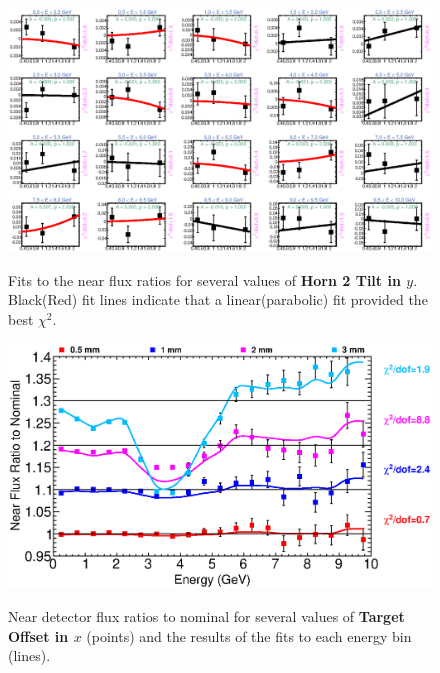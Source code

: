 \begin{figure}[ht]
  \begin{center}
    {\includegraphics[width=5.0in]{figures/Horn2YTilt_near_fits.eps}}
  \end{center}
\caption{ Fits to the near flux ratios for several values of {\bf Horn 2 Tilt in $y$}. Black(Red) fit lines indicate that a linear(parabolic) fit provided the best $\chi^2$. }
\end{figure}

\begin{figure}[ht]
  \begin{center}
    {\includegraphics[width=6.0in]{figures/TargetXOffset_near_summary.eps}}
  \end{center}
\caption{ Near detector flux ratios to nominal for several values of {\bf Target Offset in $x$} (points) and the results of the fits to each energy bin (lines).}
\end{figure}

